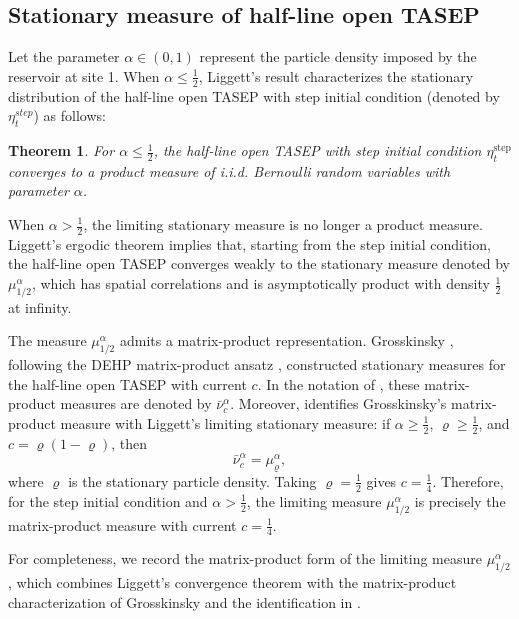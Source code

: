 \documentclass[12pt,a4paper]{amsart}
\newtheorem{theorem}{Theorem} %
\theoremstyle{remark}
\numberwithin{equation}{section} \numberwithin{theorem}{section}
\begin{document}
\subsection{Stationary measure of half-line open TASEP}
\label{ssec:stationary-measure}

Let the parameter $\alpha \in (0,1)$ represent the particle density imposed by the reservoir at site 1. When $\alpha \leq \frac{1}{2}$, Liggett's result \cite[Theorem 1.8]{Ligg75} characterizes the stationary distribution of the half-line open TASEP with step initial condition (denoted by $\eta_{t}^{step}$) as follows:
\begin{theorem}
\label{thm:stationary}
For $\alpha \leq \frac{1}{2}$, the half-line open TASEP with step initial condition $\eta_t^{\mathrm{step}}$ converges to a product measure of i.i.d. Bernoulli random variables with parameter $\alpha$. 
\end{theorem}


When $\alpha>\frac12$, the limiting stationary measure is no longer a product measure. 
Liggett's ergodic theorem \cite[Theorem 1.8]{Ligg75} implies that, starting from the step initial condition, the half-line open TASEP converges weakly to the stationary measure denoted by $\mu_{1/2}^{\alpha}$, which has spatial correlations and is asymptotically product with density $\frac12$ at infinity. 

The measure $\mu_{1/2}^{\alpha}$ admits a matrix-product representation. 
Grosskinsky \cite[Theorem 3.2]{Gro04}, following the DEHP matrix-product ansatz \cite{DEHP93}, constructed stationary measures for the half-line open TASEP with current $c$. 
In the notation of \cite{DMZ18}, these matrix-product measures are denoted by $\bar\nu_c^\alpha$. 
Moreover, \cite[Proposition 3.2]{DMZ18} identifies Grosskinsky's matrix-product measure with Liggett's limiting stationary measure: if $\alpha\geq \frac12$, $\varrho\geq\frac12$, and $c=\varrho(1-\varrho)$, then
\[
\bar\nu_c^\alpha=\mu_\varrho^\alpha,
\]
where $\varrho$ is the stationary particle density.
Taking $\varrho=\frac12$ gives $c=\frac14$. 
Therefore, for the step initial condition and $\alpha>\frac12$, the limiting measure $\mu_{1/2}^{\alpha}$ is precisely the matrix-product measure with current $c=\frac14$.

For completeness, we record the matrix-product form of the limiting measure $\mu_{1/2}^{\alpha}$, which combines Liggett's convergence theorem \cite[Theorem 1.8]{Ligg75} with the matrix-product characterization of Grosskinsky \cite[Theorem 3.2]{Gro04} and the identification in \cite[Proposition 3.2]{DMZ18}.
\end{document}

